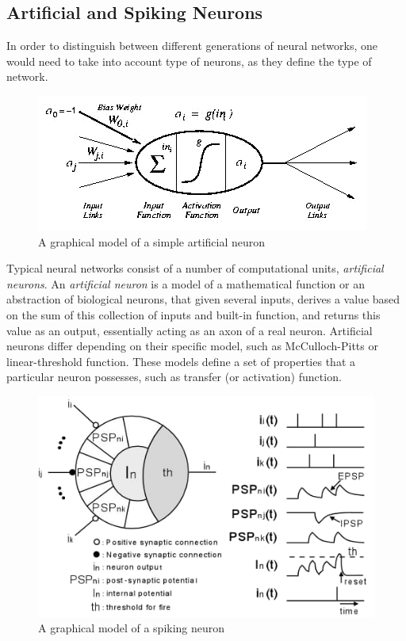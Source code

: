 \documentclass[12pt]{report}
\begin{document}
\subsection{Artificial and Spiking Neurons}

In order to distinguish between different generations of neural networks, one would need to take into account type of neurons, as they define the type of network.

\begin{figure}[h]
\begin{center}
\includegraphics[scale = 0.6]{images/neuron_model.png}
\end{center}
\caption{A graphical model of a simple artificial neuron\cite{Philosophy}}
\end{figure}

Typical neural networks consist of a number of computational units, \emph{artificial neurons}. An \emph{artificial neuron} is a model of a mathematical 
function or an abstraction of biological neurons\cite{Harmon1959}, that given several inputs, derives a value based on the sum of this collection of inputs 
and built-in function, and returns this value as an output, essentially acting as an axon of a real neuron. Artificial neurons differ depending on their 
specific model, such as McCulloch-Pitts or linear-threshold function. These models define a set of properties that a particular neuron possesses, such as 
transfer (or activation) function.

\begin{figure}[h]
\begin{center}
\includegraphics[scale = 0.8]{images/spiking-model.png}
\end{center}
\caption{A graphical model of a spiking neuron\cite{HidekiTanaka2009}}
\end{figure}
\end{document}
